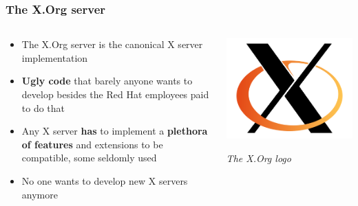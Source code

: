 \documentclass{beamer}
\begin{document}
\begin{frame}
  \frametitle{The X.Org server}
  \begin{columns}[T]
    \begin{column}{0.7\textwidth}
      \begin{itemize}
        \item The X.Org server is the canonical X server implementation
        \item \textbf{Ugly code} that barely anyone wants to develop besides the Red Hat employees paid to do that
        \item Any X server \textbf{has} to implement a \textbf{plethora of features} and extensions to be compatible, some seldomly used
        \item No one wants to develop new X servers anymore
      \end{itemize}
    \end{column}
    \begin{column}{0.3\textwidth}
      \includegraphics[width=\textwidth]{X.Org_Logo.png}

      \textit{\footnotesize The X.Org logo}
    \end{column}
  \end{columns}
\end{frame}
\end{document}
